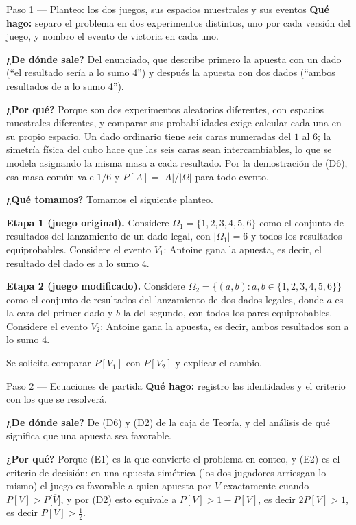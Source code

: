 \documentclass[11pt]{article}
\begin{document}
\begin{sol}

\begin{paso}{Paso 1 --- Planteo: los dos juegos, sus espacios muestrales y sus eventos}
\textbf{Qué hago:} separo el problema en dos experimentos distintos, uno por cada versión del
juego, y nombro el evento de victoria en cada uno.

\textbf{¿De dónde sale?} Del enunciado, que describe primero la apuesta con un dado (``el
resultado sería a lo sumo 4'') y después la apuesta con dos dados (``ambos resultados de a lo
sumo 4'').

\textbf{¿Por qué?} Porque son dos experimentos aleatorios diferentes, con espacios muestrales
diferentes, y comparar sus probabilidades exige calcular cada una en su propio espacio. Un dado
ordinario tiene seis caras numeradas del $1$ al $6$; la simetría física del cubo hace que las
seis caras sean intercambiables, lo que se modela asignando la misma masa a cada resultado. Por
la demostración de (D6), esa masa común vale $1/6$ y $P[A]=|A|/|\Omega|$ para todo evento.

\textbf{¿Qué tomamos?} Tomamos el siguiente planteo.

\medskip
\textbf{Etapa 1 (juego original).} Considere $\Omega_1=\{1,2,3,4,5,6\}$ como el conjunto de
resultados del lanzamiento de un dado legal, con $|\Omega_1|=6$ y todos los resultados
equiprobables. Considere el evento $V_1$: Antoine gana la apuesta, es decir, el resultado del
dado es a lo sumo $4$.

\medskip
\textbf{Etapa 2 (juego modificado).} Considere
$\Omega_2=\{(a,b): a,b\in\{1,2,3,4,5,6\}\}$ como el conjunto de resultados del lanzamiento de
dos dados legales, donde $a$ es la cara del primer dado y $b$ la del segundo, con todos los pares
equiprobables. Considere el evento $V_2$: Antoine gana la apuesta, es decir, ambos resultados son
a lo sumo $4$.

\medskip
Se solicita comparar $P[V_1]$ con $P[V_2]$ y explicar el cambio.
\end{paso}

\begin{paso}{Paso 2 --- Ecuaciones de partida}
\textbf{Qué hago:} registro las identidades y el criterio con los que se resolverá.

\textbf{¿De dónde sale?} De (D6) y (D2) de la caja de Teoría, y del análisis de qué significa
que una apuesta sea favorable.

\textbf{¿Por qué?} Porque (E1) es la que convierte el problema en conteo, y (E2) es el criterio
de decisión: en una apuesta simétrica (los dos jugadores arriesgan lo mismo) el juego es
favorable a quien apuesta por $V$ exactamente cuando $P[V]>P\big[\overline{V}\big]$, y por (D2)
esto equivale a $P[V]>1-P[V]$, es decir $2P[V]>1$, es decir $P[V]>\tfrac12$.


\end{paso}
\end{sol}
\end{document}
